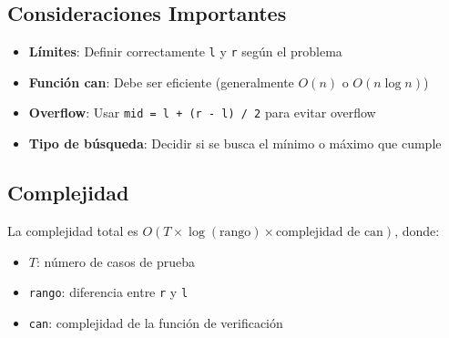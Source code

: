 \subsection{Consideraciones Importantes}
\begin{itemize}
	\item \textbf{Límites}: Definir correctamente \texttt{l} y \texttt{r} según el problema
	\item \textbf{Función can}: Debe ser eficiente (generalmente $O(n)$ o $O(n \log n)$)
	\item \textbf{Overflow}: Usar \texttt{mid = l + (r - l) / 2} para evitar overflow
	\item \textbf{Tipo de búsqueda}: Decidir si se busca el mínimo o máximo que cumple
\end{itemize}

\subsection{Complejidad}
La complejidad total es $O(T \times \log(\text{rango}) \times \text{complejidad de can})$, donde:
\begin{itemize}
	\item $T$: número de casos de prueba
	\item \texttt{rango}: diferencia entre \texttt{r} y \texttt{l}
	\item \texttt{can}: complejidad de la función de verificación
\end{itemize}


